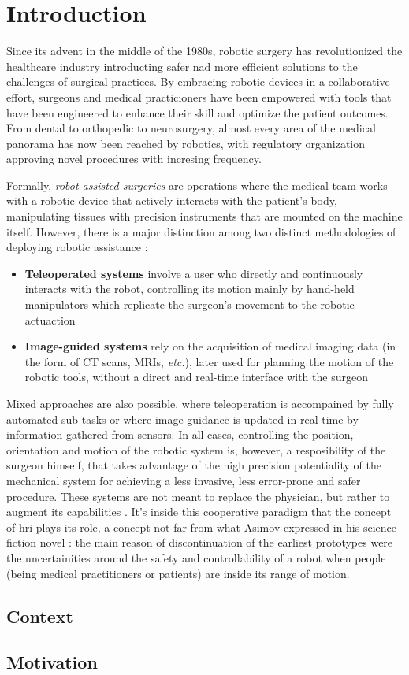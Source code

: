 \documentclass[../main.tex]{subfiles}
\begin{document}
\section{Introduction}
Since its advent in the middle of the 1980s, robotic surgery has revolutionized the healthcare industry introducting safer nad more efficient solutions to the challenges of surgical practices. By embracing robotic devices in a collaborative effort, surgeons and medical practicioners have been empowered with tools that have been engineered to enhance their skill and optimize the patient outcomes. 
From dental to orthopedic to neurosurgery, almost every area of the medical panorama has now been reached by robotics, with regulatory organization approving novel procedures with incresing frequency.

Formally, \textit{robot-assisted surgeries} are operations where the medical team works with a robotic device that actively interacts with the patient's body, manipulating tissues with precision instruments that are mounted on the machine itself. 
However, there is a major distinction among two distinct methodologies of deploying robotic assistance \cite{Hoeckelmann2015}:
\begin{itemize}
    \item \textbf{Teleoperated systems} involve a user who directly and continuously interacts with the robot, controlling its motion mainly by hand-held manipulators which replicate the surgeon's movement to the robotic actuaction
    \item \textbf{Image-guided systems} rely on the acquisition of medical imaging data (in the form of CT scans, MRIs, \textit{etc.}), later used for planning the motion of the robotic tools, without a direct and real-time interface with the surgeon
\end{itemize}
Mixed approaches are also possible, where teleoperation is accompained by fully automated sub-tasks or where image-guidance is updated in real time by information gathered from sensors. 
In all cases, controlling the position, orientation and motion of the robotic system is, however, a resposibility of the surgeon himself, that takes advantage of the high precision potentiality of the mechanical system for achieving a less invasive, less error-prone and safer procedure. These systems are not meant to replace the physician, but rather to augment its capabilities \cite{Cleary2001}. It's inside this cooperative paradigm that the concept of \ac{hri} plays its role, a concept not far from what Asimov expressed in his science fiction novel \cite{Asimov1950}: the main reason of discontinuation of the earliest prototypes were the uncertainities around the safety and controllability of a robot when people (being medical practitioners or patients) are inside its range of motion.  

\subsection{Context}

\subsection{Motivation}
\textit{}



\end{document}

